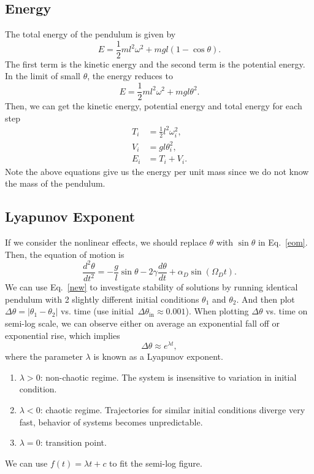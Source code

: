 \documentclass[a4paper]{article}
\begin{document}
	\subsection{Energy}
	The total energy of the pendulum is given by
	\begin{equation}
		E = \frac{1}{2}ml^{2}\omega ^{2} + mgl(1 - \cos \theta).
	\end{equation}
	The first term is the kinetic energy and the second term is the potential energy. In the limit of small $\theta$, the energy reduces to
	\begin{equation}
		E = \frac{1}{2}ml^{2}\omega ^{2} + mgl\theta ^{2}.
	\end{equation}
	Then, we can get the kinetic energy, potential energy and total energy for each step
	\begin{align}
		T_i &= \frac{1}{2}l^{2}{\omega}_i ^{2},\\
		V_i &= gl\theta _i ^{2}, \nonumber \\
		E_i &= T_i + V_i. \nonumber
	\end{align}
	Note the above equations give us the energy per unit mass since we do not know the mass of the pendulum.
	\subsection{Lyapunov Exponent} 
	If we consider the nonlinear effects, we should replace $\theta$ with $\sin\theta$ in Eq.~\eqref{eom}. Then, the equation of motion is 
	\begin{equation} \label{new}
		\frac{d^2 \theta}{dt^2} = - \frac{g}{l}\sin\theta - 2\gamma \frac{d\theta}{dt} + {\alpha}_D \sin({\Omega}_D t).
	\end{equation}
	We can use Eq.~\eqref{new} to investigate stability of solutions by running identical pendulum with 2 slightly different initial conditions $\theta _1$ and $\theta _2$. And then plot $\Delta\theta = |\theta _1 - \theta _2|$ vs. time (use initial~$\Delta \theta _{\mathrm{in}} \approx 0.001$). When plotting $\Delta \theta$ vs. time on semi-log scale, we can observe either on average	 an exponential fall off or exponential rise, which implies
	\begin{equation}
		\Delta \theta \approx e^{\lambda t},
	\end{equation}
	where the parameter $\lambda$ is known as a Lyapunov exponent. 
	\begin{enumerate}[label=\alph*)]
		\item $\lambda > 0$: non-chaotic regime. The system is insensitive to variation in initial condition.
		\item $\lambda < 0$: chaotic regime. Trajectories for similar initial conditions diverge very fast, behavior of systems becomes unpredictable.
		\item $\lambda = 0$: transition point.
	\end{enumerate}
	We can use $f(t) = \lambda t + c$ to fit the semi-log figure.
 	\newpage
 	
\end{document}
